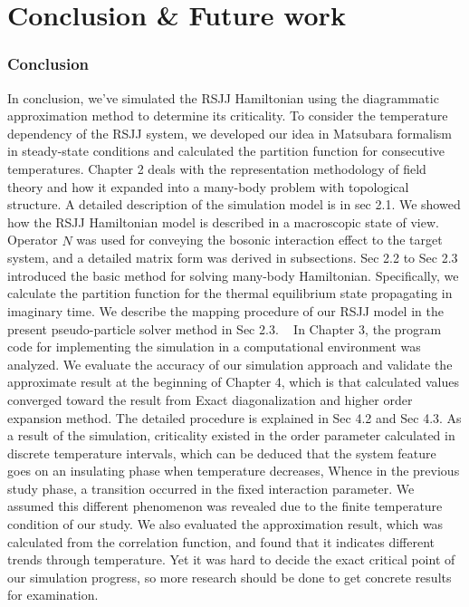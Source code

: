 \documentclass{article}
\numberwithin{equation}{section}
\begin{document}
\section{Conclusion \& Future work}
\begin{spacing}{1.5}
\subsubsection*{Conclusion}
In conclusion, we’ve simulated the RSJJ Hamiltonian using the diagrammatic approximation method to determine its criticality. 
To consider the temperature dependency of the RSJJ system, we developed our idea in Matsubara formalism in steady-state conditions 
and calculated the partition function for consecutive temperatures. Chapter 2 deals with the representation methodology of field theory 
and how it expanded into a many-body problem with topological structure. A detailed description of the simulation model is in sec 2.1. We showed how the RSJJ Hamiltonian model 
is described in a macroscopic state of view. Operator $\hat{N}$ was used for conveying the bosonic interaction effect to the target system, 
and a detailed matrix form was derived in subsections. Sec 2.2 to Sec 2.3 introduced 
the basic method for solving many-body Hamiltonian. Specifically, 
we calculate the partition function for the thermal equilibrium state propagating in imaginary time. 
We describe the mapping procedure of our RSJJ model in the present pseudo-particle solver method in Sec 2.3.  
  In Chapter 3, the program code for implementing the simulation in a computational environment 
was analyzed. We evaluate the accuracy of our simulation approach and validate the approximate result at the beginning of Chapter 4, 
which is that calculated values converged toward the result from Exact diagonalization and higher order expansion method. 
The detailed procedure is explained in Sec 4.2 and Sec 4.3. As a result of the simulation, 
criticality existed in the order parameter calculated in discrete temperature intervals, which can be deduced that the system feature goes on an insulating phase when temperature decreases, 
Whence in the previous study phase, a transition occurred in the fixed interaction parameter. 
We assumed this different phenomenon was revealed due to the finite temperature condition of our study. 
We also evaluated the approximation result, which was calculated from the correlation function, and found that it indicates different trends through temperature.
Yet it was hard to decide the exact critical point of our simulation progress, so more research should be done to get concrete results for examination. 

\end{spacing}
\end{document}
